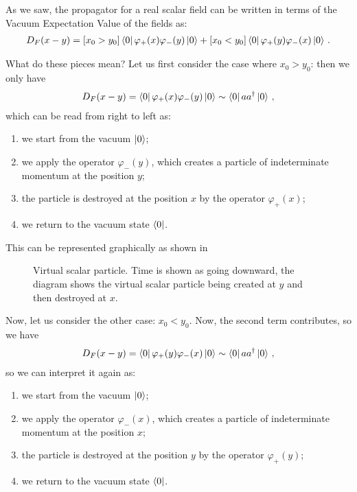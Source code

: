 \documentclass[main.tex]{subfiles}
\begin{document}
As we saw, the propagator for a real scalar field can be written in terms of the Vacuum Expectation Value of the fields as:
%
\begin{align}
D_F(x-y) = [x_0 > y_0 ] \bra{0} \varphi_+ (x) \varphi_{-} (y) \ket{0}
+ [x_0 < y_0 ] \bra{0}\varphi_{+} (y) \varphi_{-}(x) \ket{0}
\,.
\end{align}

What do these pieces mean? Let us first consider the case where \(x_0 > y_0 \): then we only have 
%
\begin{align}
D_F (x-y) = \bra{0} \varphi_{+} (x) \varphi_{-} (y) \ket{0} \sim \bra{0} a a ^\dag \ket{0}
\,,
\end{align}
%
which can be read from right to left as: 
\begin{enumerate}
    \item we start from the vacuum \(\ket{0}\);
    \item we apply the operator \(\varphi_{-} (y)\), which creates a particle of indeterminate momentum at the position \(y\);
    \item the particle is destroyed at the position \(x\) by the operator \(\varphi_{+}(x)\);
    \item we return to the vacuum state \(\bra{0}\). 
\end{enumerate}

This can be represented graphically as shown in 

\begin{figure}[ht]
\centering
{}
\caption{Virtual scalar particle. Time is shown as going downward, the diagram shows the virtual scalar particle being created at \(y\) and then destroyed at \(x\).}
\label{fig:virtual-scalar-particle-diagram-1}
\end{figure}

Now, let us consider the other case: \(x_0 < y_0 \). Now, the second term contributes, so we have 
%
\begin{align}
D_F (x-y) = \bra{0} \varphi_{+} (y) \varphi_{-} (x) \ket{0} \sim \bra{0} a a ^\dag \ket{0}
\,,
\end{align}
%
so we can interpret it again as: 
\begin{enumerate}
    \item we start from the vacuum \(\ket{0}\);
    \item we apply the operator \(\varphi_{-} (x)\), which creates a particle of indeterminate momentum at the position \(x\);
    \item the particle is destroyed at the position \(y\) by the operator \(\varphi_{+}(y)\);
    \item we return to the vacuum state \(\bra{0}\). 
\end{enumerate}
\end{document}
